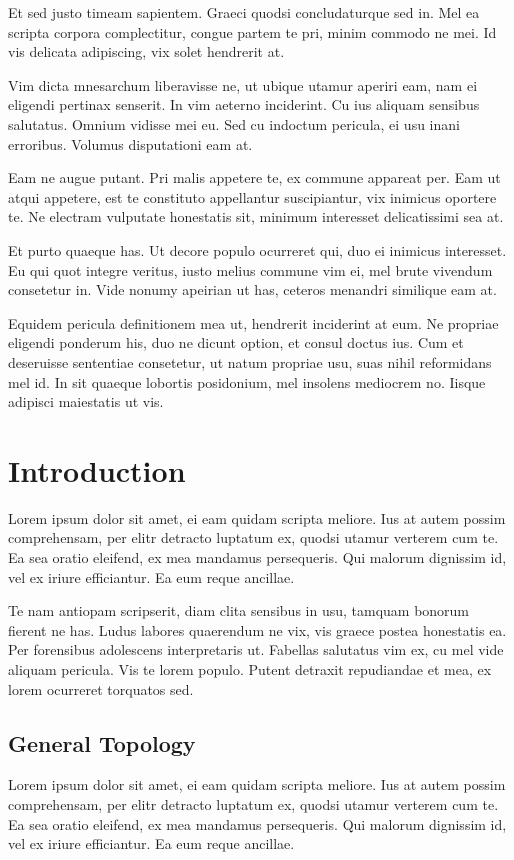 \documentclass[12pt, a4paper]{article}
\theoremstyle{definition}
\theoremstyle{remark}
\numberwithin{equation}{section}
\numberwithin{figure}{section}
\numberwithin{table}{section}
\begin{document}
        Et sed justo timeam sapientem. Graeci quodsi concludaturque sed in. Mel ea scripta corpora complectitur, congue partem te pri, minim commodo ne mei. Id vis delicata adipiscing, vix solet hendrerit at.

        Vim dicta mnesarchum liberavisse ne, ut ubique utamur aperiri eam, nam ei eligendi pertinax senserit. In vim aeterno inciderint. Cu ius aliquam sensibus salutatus. Omnium vidisse mei eu. Sed cu indoctum pericula, ei usu inani erroribus. Volumus disputationi eam at.

        Eam ne augue putant. Pri malis appetere te, ex commune appareat per. Eam ut atqui appetere, est te constituto appellantur suscipiantur, vix inimicus oportere te. Ne electram vulputate honestatis sit, minimum interesset delicatissimi sea at.

        Et purto quaeque has. Ut decore populo ocurreret qui, duo ei inimicus interesset. Eu qui quot integre veritus, iusto melius commune vim ei, mel brute vivendum consetetur in. Vide nonumy apeirian ut has, ceteros menandri similique eam at.

        Equidem pericula definitionem mea ut, hendrerit inciderint at eum. Ne propriae eligendi ponderum his, duo ne dicunt option, et consul doctus ius. Cum et deseruisse sententiae consetetur, ut natum propriae usu, suas nihil reformidans mel id. In sit quaeque lobortis posidonium, mel insolens mediocrem no. Iisque adipisci maiestatis ut vis.

    \newpage
    \tableofcontents

    \newpage
    \pagestyle{fancy}
    \lhead{}
    \section{Introduction}
        Lorem ipsum dolor sit amet, ei eam quidam scripta meliore. Ius at autem possim comprehensam, per elitr detracto luptatum ex, quodsi utamur verterem cum te. Ea sea oratio eleifend, ex mea mandamus persequeris. Qui malorum dignissim id, vel ex iriure efficiantur. Ea eum reque ancillae.

        Te nam antiopam scripserit, diam clita sensibus in usu, tamquam bonorum fierent ne has. Ludus labores quaerendum ne vix, vis graece postea honestatis ea. Per forensibus adolescens interpretaris ut. Fabellas salutatus vim ex, cu mel vide aliquam pericula. Vis te lorem populo. Putent detraxit repudiandae et mea, ex lorem ocurreret torquatos sed.
        \subsection{General Topology}
            Lorem ipsum dolor sit amet, ei eam quidam scripta meliore. Ius at autem possim comprehensam, per elitr detracto luptatum ex, quodsi utamur verterem cum te. Ea sea oratio eleifend, ex mea mandamus persequeris. Qui malorum dignissim id, vel ex iriure efficiantur. Ea eum reque ancillae.
\end{document}
